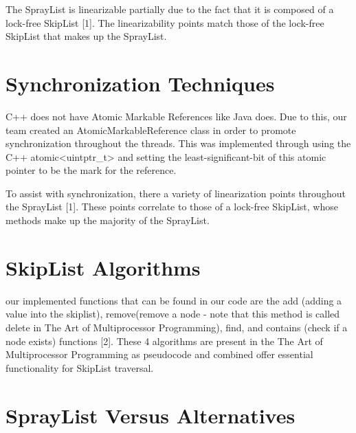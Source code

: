 \documentclass[conference]{IEEEtran}
\begin{document}
The SprayList is linearizable partially due to the fact that it is composed of a lock-free SkipList [1]. The linearizability points match those of the lock-free SkipList that makes up the SprayList.


\section {Synchronization Techniques}


C++ does not have Atomic Markable References like Java does. Due to this, our team created an AtomicMarkableReference class in order to promote synchronization throughout the threads. This was implemented through using the C++ atomic<uintptr_t> and setting the least-significant-bit of this atomic pointer to be the mark for the reference.


To assist with synchronization, there a variety of linearization points throughout the SprayList [1]. These points correlate to those of a lock-free SkipList, whose methods make up the majority of the SprayList.

\section {SkipList Algorithms}

our implemented functions that can be found in our code are the add (adding a value into the skiplist), remove(remove a node - note that this method is called delete in  The Art of Multiprocessor Programming), find, and contains (check if a node exists) functions [2]. These 4 algorithms are present in the The Art of Multiprocessor Programming as pseudocode and combined offer essential functionality for SkipList traversal.

\section {SprayList Versus Alternatives}
\end{document}
